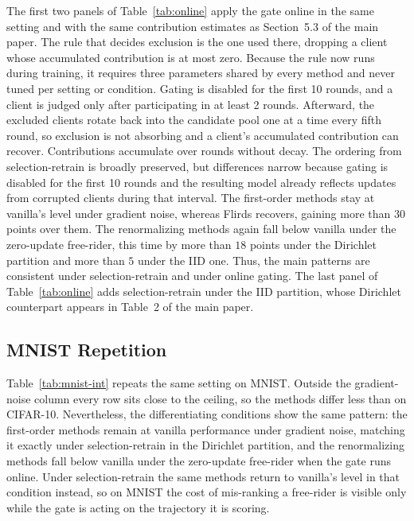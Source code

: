 \documentclass[letterpaper]{article} %
\theoremstyle{definition}
\begin{document}
The first two panels of Table~\ref{tab:online} apply the gate online in the
same setting and with the same contribution estimates as
Section~5.3 of the main paper. The rule that
decides exclusion is the one used there, dropping a client whose accumulated
contribution is at most zero. Because the rule now runs during training, it
requires three parameters shared by every method and never tuned per
setting or condition. Gating is disabled for the first 10 rounds, and a client is judged only after
participating in at least 2 rounds. Afterward, the excluded clients rotate back
into the candidate pool one at a time every fifth round, so exclusion is not absorbing
and a client's accumulated contribution can recover. Contributions accumulate over rounds without
decay. The ordering from selection-retrain is
broadly preserved, but differences narrow because gating is disabled for the
first 10 rounds and the resulting model already reflects updates from corrupted
clients during that interval. The first-order methods stay at vanilla's level
under gradient noise, whereas Flirds recovers, gaining more than $30$ points
over them. The renormalizing methods again fall below vanilla under the
zero-update free-rider, this time by more than $18$ points under the Dirichlet
partition and more than $5$ under the IID one. Thus, the main
patterns are consistent under selection-retrain and under online gating.
The last panel of Table~\ref{tab:online} adds selection-retrain under the IID
partition, whose Dirichlet counterpart appears in
Table~2 of the main paper.

\subsection{MNIST Repetition}
\label{app:mnist-rep}

Table~\ref{tab:mnist-int} repeats the same setting on MNIST. Outside the
gradient-noise column every row sits close to the ceiling, so the
methods differ less than on CIFAR-10. Nevertheless, the differentiating
conditions show the same pattern: the first-order methods remain at vanilla
performance under gradient noise, matching it exactly under selection-retrain
in the Dirichlet partition, and the renormalizing methods fall below vanilla
under the zero-update free-rider when the gate runs online. Under
selection-retrain the same methods return to vanilla's level in that condition
instead, so on MNIST the cost of mis-ranking a free-rider is visible only while
the gate is acting on the trajectory it is scoring.
\end{document}
